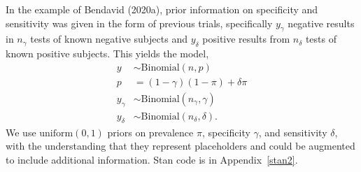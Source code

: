 \documentclass[11pt]{article}
\begin{document}
In the example of Bendavid (2020a), prior information on specificity
and sensitivity was given in the form of previous trials, specifically
$y_{\gamma}$ negative results in $n_{\gamma}$ tests of known negative
subjects and $y_{\delta}$ positive results from $n_{\delta}$ tests of
known positive subjects.  This yields the model,
%
\begin{align*}
   y & \sim \mbox{Binomial} (n, p)\\
  p & = (1-\gamma)(1- \pi)+ \delta\pi\\
   y_{\gamma} & \sim \mbox{Binomial} (n_{\gamma}, \gamma)\\
   y_{\delta} & \sim \mbox{Binomial} (n_{\delta}, \delta).
\end{align*}
%
We use $\mbox{uniform}(0,1)$ priors on prevalence $\pi$, specificity
$\gamma$, and sensitivity $\delta$, with the understanding that they
represent placeholders and could be augmented to include additional
information.  Stan code is in Appendix~\ref{stan2}.
\end{document}
